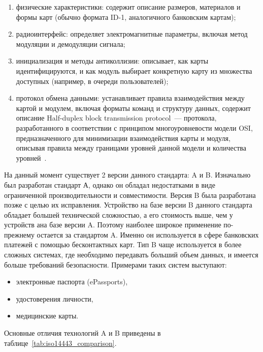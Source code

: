 \begin{enumerate}
    \item физические характеристики: содержит описание размеров, материалов и формы карт (обычно формата ID-1, аналогичного банковским картам);
    \item радиоинтерфейс: определяет электромагнитные параметры, включая метод модуляции и демодуляции сигнала;
    \item инициализация и методы антиколлизии: описывает, как карты идентифицируются, и как модуль выбирает конкретную карту из множества доступных (например, в очереди пользователей);
    \item протокол обмена данными: устанавливает правила взаимодействия между картой и модулем, включая форматы команд и структуру данных, содержит описание Half-duplex block transmission protocol~--- протокола, разработанного в соответствии с принципом многоуровневости модели OSI, предназначенного для минимизации взаимодействия карты и модуля, описывая правила между границами уровней данной модели и количества уровней~\cite{iso_14443_en}.
\end{enumerate}


На данный момент существует 2 версии данного стандарта: A и B.
Изначально был разработан стандарт А, однако он обладал недостатками в виде ограниченной производительности и совместимости.
Версия B была разработана позже с целью их исправления.
Устройство на базе версии B данного стандарта обладает большей технической сложностью, а его стоимость выше, чем у устройств ана базе версии A.
Поэтому наиболее широкое применение по-прежнему остается за стандартом A.
Именно он используется в сфере банковских платежей с помощью бесконтактных карт.
Тип B чаще используется в более сложных системах, где необходимо передавать больший объем данных, и имеется больше требований безопасности.
Примерами таких систем выступают:

\begin{itemize}
    \item электронные паспорта (ePassports),
    \item удостоверения личности,
    \item медицинские карты.
\end{itemize}

Основные отличия технологий A и B приведены в таблице~\ref{tab:iso14443_comparison}.

